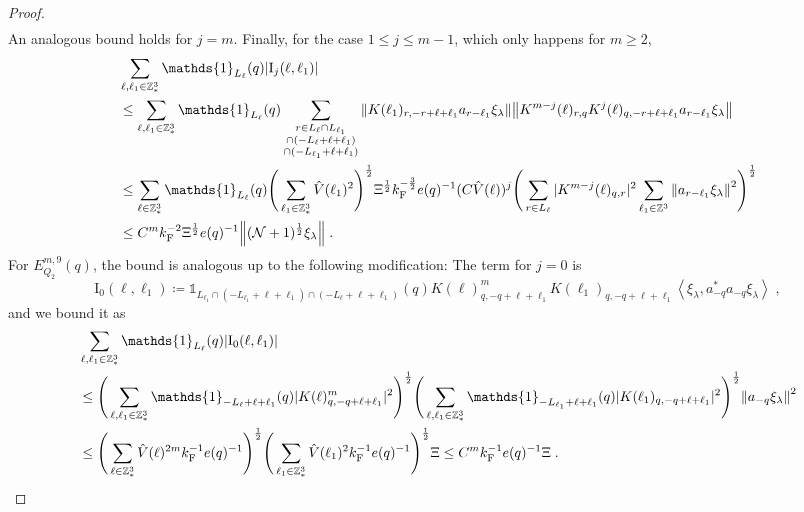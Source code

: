 \documentclass[12pt,a4paper]{article}
\numberwithin{equation}{section}
\newcommand{\1}{\mathbb{I}}
\newcommand{\F}{\mathrm{F}}
\newcommand{\I}{\mathrm{I}}
\newcommand{\Z}{\mathbb{Z}}
\newcommand{\NN}{\mathcal{N}}
\newcommand{\half}{\frac{1}{2}}
\newcommand{\eva}[1]{\left\langle #1 \right\rangle}
\theoremstyle{plain}
\theoremstyle{definition}
\theoremstyle{remark}
\theoremstyle{plain}
\theoremstyle{definition}
\theoremstyle{remark}
\begin{document}
\begin{proof}
\begin{align}
\end{align}
An analogous bound holds for $ j = m $. Finally, for the case $ 1 \le j \le m-1 $, which only happens for $ m \ge 2 $,
\begin{align}
	&\sum_{\ell,\ell_1 \in \Z^3_*} \mathds{1}_{L_\ell}(q) |\I_j(\ell, \ell_1)| \nonumber\\
	&\leq \sum_{\ell,\ell_1 \in \Z^3_*} \mathds{1}_{L_\ell}(q) \sum\limits_{\substack{r\in L_{\ell} \cap L_{\ell_1}\\\cap (-L_{\ell}+\ell+\ell_1) \\ \cap (-L_{\ell_1}+\ell+\ell_1)}} \norm{ K(\ell_1)_{r,-r+\ell+\ell_1} a_{r-\ell_1} \xi_\lambda} \norm{ K^{m-j}(\ell)_{r,q} K^j(\ell)_{q,-r+\ell+\ell_1} a_{r-\ell_1} \xi_\lambda} \nonumber\\
	&\leq \sum_{\ell \in \Z^3_*} \mathds{1}_{L_\ell}(q)
		\Bigg( \sum_{\ell_1 \in \Z^3_*} \hat{V}(\ell_1)^2 \Bigg)^{\half}
		\Xi^{\half} k_{\F}^{-\frac 32} e(q)^{-1} (C \hat{V}(\ell))^j
		\Bigg( \sum_{r \in L_{\ell}} |K^{m-j}(\ell)_{q,r}|^2 
		\sum_{\ell_1 \in \Z^3} \norm{a_{r-\ell_1} \xi_\lambda}^2 \Bigg)^{\half} \nonumber\\
	&\leq C^m k_{\F}^{-2} \Xi^{\half} e(q)^{-1} \norm{(\NN+1)^{\half} \xi_\lambda} \;. \label{eq:estEQ2182}
\end{align}
For $ E^{m,9}_{Q_2}(q) $, the bound is analogous up to the following modification: The term for $ j = 0 $ is
\begin{equation}
	\I_0(\ell,\ell_1)
	\coloneq \mathds{1}_{L_{\ell_1} \cap (-L_{\ell_1} + \ell+\ell_1) \cap (-L_\ell + \ell+\ell_1)}(q)
		K(\ell)^m_{q,-q+\ell+\ell_1}
		K(\ell_1)_{q,-q+\ell+\ell_1}
		\eva{\xi_\lambda, a_{-q}^* a_{-q} \xi_\lambda} \;,
\end{equation}
and we bound it as
\begin{align}
	&\sum_{\ell,\ell_1 \in \Z^3_*} \mathds{1}_{L_\ell}(q) |\I_0(\ell,\ell_1)| \nonumber\\
	&\leq \Bigg( \sum_{\ell, \ell_1 \in \Z^3_*} \mathds{1}_{-L_\ell + \ell+\ell_1}(q) |K(\ell)^m_{q,-q+\ell+\ell_1}|^2 \Bigg)^{\half}
		\Bigg( \sum_{\ell, \ell_1 \in \Z^3_*} \mathds{1}_{-L_{\ell_1} + \ell+\ell_1}(q) |K(\ell_1)_{q,-q+\ell+\ell_1}|^2 \Bigg)^{\half}
	\norm{ a_{-q} \xi_\lambda }^2 \nonumber\\
	&\leq \Bigg( \sum_{\ell\in \Z^3_*} \hat{V}(\ell)^{2m} k_{\F}^{-1} e(q)^{-1} \Bigg)^{\half}
		\Bigg( \sum_{\ell_1 \in \Z^3_*} \hat{V}(\ell_1)^2 k_{\F}^{-1} e(q)^{-1} \Bigg)^{\half}
	\Xi
	\leq C^m
		k_{\F}^{-1} e(q)^{-1} \Xi \;.\label{eq:estEQ2181_bis}
\end{align}
\end{proof}
\end{document}
